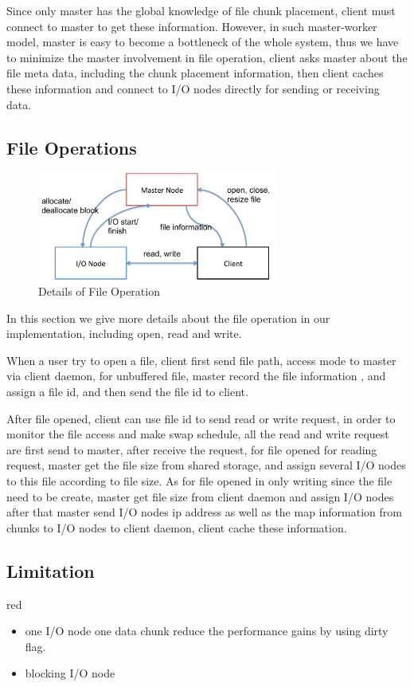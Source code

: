 Since only master has the global knowledge of file chunk placement, client must connect to master
to get these information.
However, in such master-worker model, master is easy to become a bottleneck of the whole system,
thus we have to minimize the master involvement in file operation, client asks master about the
file meta data, including the chunk placement information, then client caches these information and
connect to I/O nodes directly for sending or receiving data.

\subsection{File Operations}

\begin{figure}
\centering
\includegraphics[width=8cm]{img/file_operation}
\caption{Details of File Operation}
\label{implementation:file operation}
\end{figure}

In this section we give more details about the file operation in our implementation, including open, read and write.

When a user try to open a file, client first send file path, access mode to master via client
daemon, for unbuffered file, master record the file information , and assign a file id, and then send the file id to client.

After file opened, client can use file id to send read or write request, in order to monitor the
file access and make swap schedule, all the read and write request are first send to master, after
receive the request, for file opened for reading request, master get the file size from shared
storage, and assign several I/O nodes to this file according to file size.
As for file opened in only writing since the file need to be create, master get file size from
client daemon and assign I/O nodes after that master send I/O nodes ip address as well as the map
information from chunks to I/O nodes to client daemon, client cache these information.

\subsection{Limitation}
\begin{color}{red}
\begin{itemize}
  \item one I/O node one data chunk reduce the performance gains by using dirty flag.
  \item blocking I/O node
\end{itemize}
\end{color}
